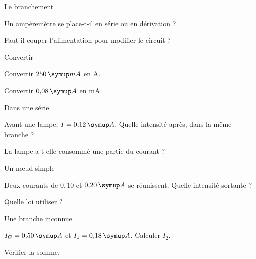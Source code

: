 \par\noindent\begin{minipage}{\linewidth}
\begin{exercice}[1]{Le branchement}
\begin{questions}
\item Un ampèremètre se place-t-il en série ou en dérivation ?
\item Faut-il couper l’alimentation pour modifier le circuit ?
\end{questions}
\end{exercice}
\end{minipage}
\par\noindent\begin{minipage}{\linewidth}
\begin{exercice}[1]{Convertir}
\begin{questions}
\item Convertir $250\unite{mA}$ en A.
\item Convertir $0{,}08\unite A$ en mA.
\end{questions}
\end{exercice}
\end{minipage}
\par\noindent\begin{minipage}{\linewidth}
\begin{exercice}[1]{Dans une série}
\begin{questions}
\item Avant une lampe, $I=0{,}12\unite A$. Quelle intensité après, dans la même branche ?
\item La lampe a-t-elle consommé une partie du courant ?
\end{questions}
\end{exercice}
\end{minipage}
\par\noindent\begin{minipage}{\linewidth}
\begin{exercice}[1]{Un nœud simple}
\begin{questions}
\item Deux courants de $0{,}10$ et $0{,}20\unite A$ se réunissent. Quelle intensité sortante ?
\item Quelle loi utiliser ?
\end{questions}
\end{exercice}
\end{minipage}
\clearpage{}
\par\noindent\begin{minipage}{\linewidth}
\begin{exercice}[2]{Une branche inconnue}
\begin{questions}
\item $I_G=0{,}50\unite A$ et $I_1=0{,}18\unite A$. Calculer $I_2$.
\item Vérifier la somme.
\end{questions}
\end{exercice}
\end{minipage}
